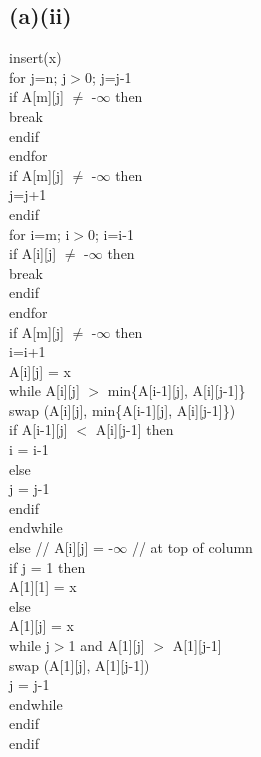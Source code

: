 \documentclass{article}[12pt]
\begin{document}
\subsection*{(a)(ii)}
insert(x) \\
\indent for j=n; j$>$0; j=j-1 \\
\indent \indent if A[m][j] $\neq$ -$\infty$ then \\
\indent \indent \indent break \\
\indent \indent endif \\
\indent endfor \\
\indent if A[m][j] $\neq$ -$\infty$ then \\
\indent \indent j=j+1 \\
\indent endif \\
\indent for i=m; i$>$0; i=i-1 \\
\indent \indent if A[i][j] $\neq$ -$\infty$ then \\
\indent \indent \indent break \\
\indent \indent endif \\
\indent endfor \\
\indent if A[m][j] $\neq$ -$\infty$ then \\
\indent \indent i=i+1 \\
\indent \indent A[i][j] = x \\
\indent \indent while A[i][j] $>$ min\{A[i-1][j], A[i][j-1]\}  \\
\indent \indent \indent swap (A[i][j], min\{A[i-1][j], A[i][j-1]\}) \\
\indent \indent \indent if A[i-1][j] $<$ A[i][j-1] then \\
\indent \indent \indent \indent i = i-1 \\
\indent \indent \indent else \\
\indent \indent \indent \indent j = j-1 \\
\indent \indent \indent endif \\
\indent \indent endwhile \\
\indent else // A[i][j] = -$\infty$ // at top of column \\
\indent \indent if j = 1 then \\
\indent \indent \indent A[1][1] = x \\
\indent \indent else \\
\indent \indent \indent A[1][j] = x \\
\indent \indent \indent while j$>$1 and A[1][j] $>$ A[1][j-1] \\
\indent \indent \indent \indent swap (A[1][j], A[1][j-1]) \\
\indent \indent \indent \indent j = j-1 \\
\indent \indent \indent endwhile \\
\indent \indent endif \\
\indent endif \\ \\
\end{document}
